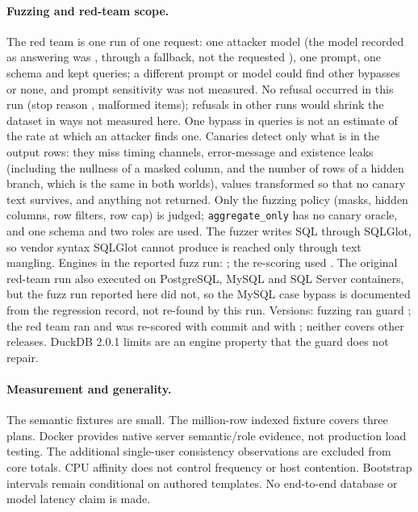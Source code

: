 \documentclass[sigconf,nonacm,natbib=false]{acmart}
\begin{document}
\paragraph{Fuzzing and red-team scope.}
The red team is one run of one request: one attacker model (the model recorded
as answering was \RTModelAnswered{}, through a fallback, not the requested
\RTModelRequested{}), one prompt, one schema and \RTAttacks{} kept queries; a
different prompt or model could find other bypasses or none, and prompt
sensitivity was not measured. No refusal occurred in this run (stop reason
\RTStop{}, \RTMalformed{} malformed items); refusals in other runs would
shrink the dataset in ways not measured here. One bypass in \RTAttacks{} queries is
not an estimate of the rate at which an attacker finds one. Canaries detect only what is in the output rows: they
miss timing channels, error-message and existence leaks (including the
nullness of a masked column, and the number of rows of a hidden branch, which
is the same in both worlds), values transformed so that no canary
text survives, and anything not returned. Only the fuzzing policy (masks,
hidden columns, row filters, row cap) is judged; \texttt{aggregate\_only} has no
canary oracle, and one schema and two roles are used. The fuzzer writes SQL
through SQLGlot, so vendor syntax SQLGlot cannot produce is reached
only through text mangling. Engines in the reported fuzz run: \CFEngines{};
the re-scoring used \RTRescoreEngines{}. The original red-team run also
executed on PostgreSQL, MySQL and SQL Server containers, but the fuzz run
reported here did not, so the MySQL case bypass is documented from the regression
record, not re-found by this run. Versions: fuzzing ran guard \CFGuard{}; the red
team ran \RTGuardVersion{} and was re-scored with commit \texttt{\RTRescoreSha{}}
and with \RTRescoreLater{}; neither covers other releases. DuckDB 2.0.1 limits are an engine property that the guard
does not repair.

\paragraph{Measurement and generality.}
The semantic fixtures are small. The million-row indexed fixture covers
three plans. Docker provides native server semantic/role evidence, not
production load testing. The additional single-user consistency observations
are excluded from core totals. CPU affinity does not control frequency or
host contention. Bootstrap intervals remain conditional on authored templates.
No end-to-end database or model latency claim is made.
\end{document}
